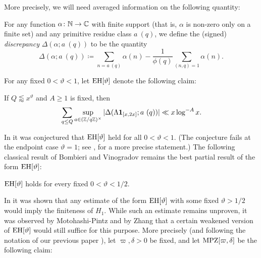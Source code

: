 More precisely, we will need averaged information on the following quantity:

\begin{definition}[Discrepancy]
For any function $\alpha \colon \mathbb{N} \to \mathbb{C}$ with finite support (that is, $\alpha$ is non-zero only on a finite set) and any
primitive residue class $a\ (q)$, we define the (signed)
\emph{discrepancy} $\Delta(\alpha; a\ (q))$ to be the quantity
\begin{equation}\label{disc-def}
  \Delta(\alpha; a\ (q)) \coloneqq \sum_{n = a\ (q)} \alpha(n) - 
  \frac{1}{\phi(q)} \sum_{(n,q)=1} \alpha(n).
\end{equation}
\end{definition}

For any fixed $0 < \vartheta < 1$, let $\operatorname*{EH}[\vartheta]$ denote the following claim:

\begin{claim}\label{eh-def}  If $Q \lessapprox x^\vartheta$ and $A \geq 1$ is fixed, then
\begin{equation}\label{qq}
 \sum_{q \leq Q} \sup_{a \in (\mathbb{Z}/q\mathbb{Z})^\times} |\Delta(\Lambda \mathbf{1}_{[x,2x]}; a\ (q))| \ll x \log^{-A} x.
\end{equation} 
\end{claim}

In \cite{elliott} it was conjectured that $\operatorname*{EH}[\vartheta]$ held for all $0 < \vartheta < 1$.  (The conjecture fails at the endpoint case $\vartheta=1$; see \cite{fg}, \cite{fghm} for a more precise statement.)  The following classical result of Bombieri \cite{bombieri} and Vinogradov \cite{vinogradov} remains the best partial result of the form $\operatorname*{EH}[\vartheta]$:

\begin{theorem}\label{bv-thm}\cite{bombieri,vinogradov}  $\operatorname*{EH}[\vartheta]$ holds for every fixed $0 < \vartheta < 1/2$.
\end{theorem}

In \cite{gpy} it was shown that any estimate of the form $\operatorname*{EH}[\vartheta]$ with some fixed $\vartheta > 1/2$ would imply the finiteness of $H_1$.  While such an estimate remains unproven, it was observed by Motohashi-Pintz \cite{mp} and by Zhang \cite{zhang} that a certain weakened version of $\operatorname*{EH}[\vartheta]$ would still suffice for this purpose.  More precisely (and following the notation of our previous paper \cite{polymath8a}), let $\varpi,\delta > 0$ be fixed, and let $\operatorname*{MPZ}[\varpi,\delta]$ be the following claim:

